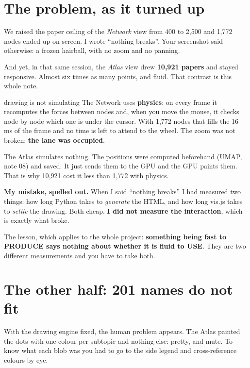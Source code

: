 \documentclass[11pt,a4paper]{article}
\begin{document}
\section{The problem, as it turned up}

We raised the paper ceiling of the \emph{Network} view from 400 to 2,500 and 1,772 nodes ended
up on screen. I wrote ``nothing breaks''. Your screenshot said otherwise: a frozen hairball,
with no zoom and no panning.

And yet, in that same session, the \emph{Atlas} view drew \textbf{10,921 papers} and stayed
responsive. Almost six times as many points, and fluid. That contrast is this whole note.

\begin{concepto}{drawing is not simulating}
The Network uses \textbf{physics}: on every frame it recomputes the forces between nodes and,
when you move the mouse, it checks node by node which one is under the cursor. With 1,772 nodes
that fills the 16 ms of the frame and no time is left to attend to the wheel. The zoom was not
broken: \textbf{the lane was occupied}.

The Atlas simulates nothing. The positions were computed beforehand (UMAP, note 08) and saved.
It just sends them to the GPU and the GPU paints them. That is why 10,921 cost it less than
1,772 with physics.
\end{concepto}

\begin{ojo}
\textbf{My mistake, spelled out.} When I said ``nothing breaks'' I had measured two things: how long Python takes to
\emph{generate} the HTML, and how long vis.js takes to \emph{settle} the drawing. Both cheap.
\textbf{I did not measure the interaction}, which is exactly what broke.

The lesson, which applies to the whole project: \textbf{something being fast to PRODUCE says
nothing about whether it is fluid to USE}. They are two different measurements and you have to
take both.
\end{ojo}

\section{The other half: 201 names do not fit}

With the drawing engine fixed, the human problem appears. The Atlas painted the dots with one
colour per subtopic and nothing else: pretty, and mute. To know what each blob was you had to
go to the side legend and cross-reference colours by eye.
\end{document}
